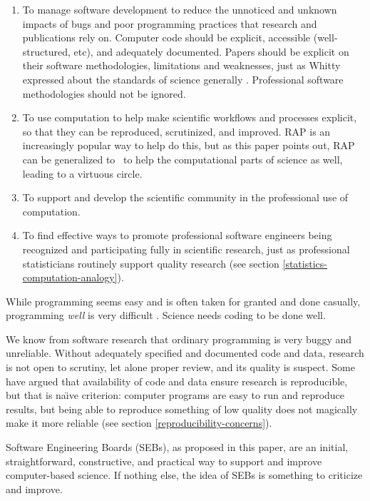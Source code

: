 \documentclass{comjnl}
\begin{document}
\begin{enumerate}\raggedright
\item 
To manage software development to reduce the unnoticed and unknown impacts of bugs and poor programming practices that research and publications rely on. Computer code should be explicit, accessible (well-structured, etc), and adequately documented. Papers should be explicit on their software methodologies, limitations and weaknesses, just as Whitty expressed about the standards of science generally \cite{whitty}. Professional software methodologies should not be ignored.

\item 
To use computation to help make scientific workflows and processes explicit, so that they can be reproduced, scrutinized, and improved. RAP is an increasingly popular way to help do this, but as this paper points out, RAP can be generalized to \RAPstar\ to help the computational parts of science as well, leading to a virtuous circle.

\item
To support and develop the scientific community in the professional use of computation.

\item
To find effective ways to promote professional software engineers being recognized and participating fully in scientific research, just as professional statisticians routinely support quality research (see section \ref{statistics-computation-analogy}).
\end{enumerate}

While programming seems easy and is often taken for granted and done casually, programming \emph{well\/} is very difficult \cite{fixit}. Science needs coding to be done well. 

We know from software research that ordinary programming is very buggy and unreliable. Without adequately specified and documented code and data, research is not open to scrutiny, let alone proper review, and its quality is suspect. Some have argued that availability of code and data ensure research is reproducible, but that is na\"\i ve criterion: computer programs are easy to run and reproduce results, but being able to reproduce something of low quality does not magically make it more reliable \cite{reproducibility,relit,popper-conjectures-refutations} (see section \ref{reproducibility-concerns}). 

Software Engineering Boards (SEBs), as proposed in this paper, are an initial, straightforward, constructive, and practical way to support and improve computer-based science. If nothing else, the idea of SEBs is something to criticize and improve.
\end{document}
